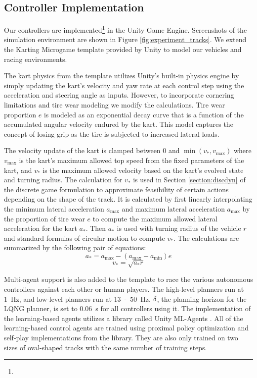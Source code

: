 \subsection{Controller Implementation}
Our controllers are implemented\footnote{\codeurl} in the Unity Game Engine. Screenshots of the simulation environment are shown in Figure \ref{fig:experiment_tracks}. We extend the Karting Microgame template provided by Unity \cite{microkarting} to model our vehicles and racing environments. 

The kart physics from the template utilizes Unity's built-in physics engine by simply updating the kart's velocity and yaw rate at each control step using the acceleration and steering angle as inputs. However, to incorporate cornering limitations and tire wear modeling we modify the calculations. Tire wear proportion $e$ is modeled as an exponential decay curve that is a function of the accumulated angular velocity endured by the kart. This model captures the concept of losing grip as the tire is subjected to increased lateral loads. 

The velocity update of the kart is clamped between 0 and $\min(v_*, v_{\text{max}})$ where $v_{\text{max}}$ is the kart's maximum allowed top speed from the fixed parameters of the kart, and $v_*$ is the maximum allowed velocity based on the kart's evolved state and turning radius. The calculation for $v_*$ is used in Section \ref{section:discdyn} of the discrete game formulation to approximate feasibility of certain actions depending on the shape of the track. It is calculated by first linearly interpolating the minimum lateral acceleration $a_{\text{max}}$ and maximum lateral acceleration $a_{\text{max}}$ by the proportion of tire wear $e$ to compute the maximum allowed lateral acceleration for the kart $a_*$. Then $a_*$ is used with turning radius of the vehicle $r$ and standard formulas of circular motion to compute $v_*$. The calculations are summarized by the following pair of equations:
\begin{equation}
     a_* = a_{\text{max}} - (a_{\text{max}}-a_{\text{min}})e
\end{equation}
\begin{equation}
    v_* = \sqrt{a_*r}
\end{equation}

Multi-agent support is also added to the template to race the various autonomous controllers against each other or human players. The high-level planners run at \SI{1}{\hertz}, and low-level planners run at \SI{13}-\SI{50}{\hertz}. $\Bar{\delta}$, the planning horizon for the LQNG planner, is set to \SI{0.06}{\second} for all controllers using it. The implementation of the learning-based agents utilizes a library called Unity ML-Agents \cite{mlagents}. All of the learning-based control agents are trained using proximal policy optimization and self-play implementations from the library. They are also only trained on two sizes of oval-shaped tracks with the same number of training steps. 


